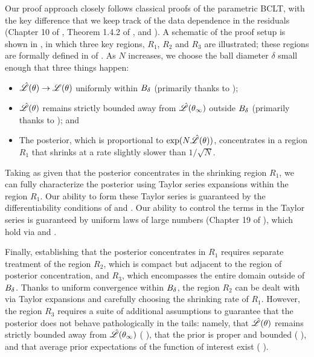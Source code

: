Our proof approach closely follows classical proofs of the parametric BCLT, with
the key difference that we keep track of the data dependence in the residuals
(Chapter 10 of \citet{van:2000:asymptotic}, Theorem 1.4.2 of
\citet{ghosh:2003:bayesian}, and \citet{lehman:1983:pointestimation}). A
schematic of the proof setup is shown in , in which three
key regions, $R_1$, $R_2$ and $R_3$ are illustrated;
these regions are formally defined in 
of .
As $N$ increases, we choose
the ball diameter $\delta$ small enough that three things happen:
%
\begin{itemize}[nosep]
\item $\hat{\mathscr{L}}(\theta) \rightarrow \mathscr{L}(\theta)$ uniformly within
$B_{\delta}$ (primarily thanks to 
);
\item $\hat{\mathscr{L}}(\theta)$ remains strictly bounded away from $\hat{\mathscr{L}}(\theta_{\infty})$ outside
$B_{\delta}$ (primarily thanks to  ); and
\item The posterior, which is proportional to $\exp(N \hat{\mathscr{L}}(\theta))$, concentrates
in a region $R_1$ that shrinks at a rate slightly slower than $1/\sqrt{N}$.
\end{itemize}




Taking as given that the posterior concentrates in the shrinking region $R_1$,
we can fully characterize the posterior using Taylor series expansions within
the region $R_1$.  Our ability to form these Taylor series is guaranteed by the
differentiability conditions of   and
 .  Our ability to control the terms in
the Taylor series is guaranteed by uniform laws of large numbers (Chapter 19 of
\citet{van:2000:asymptotic}), which hold via 
 and  .

Finally, establishing that the posterior concentrates in $R_1$ requires separate
treatment of the region $R_2$, which is compact but adjacent to the region of
posterior concentration, and $R_3$, which encompasses the entire domain outside
of $B_{\delta}$.  Thanks to uniform convergence within
$B_{\delta}$, the region $R_2$ can be dealt with via Taylor expansions
and carefully choosing the shrinking rate of $R_1$.  However, the region $R_3$
requires a suite of additional assumptions to guarantee that the posterior does
not behave pathologically in the tails: namely, that $\hat{\mathscr{L}}(\theta)$ remains
strictly bounded away from $\hat{\mathscr{L}}(\theta_{\infty})$ (
), that the prior is proper and bounded (
), and that average prior expectations of the
function of interest exist ( ).

